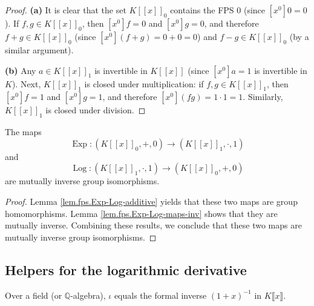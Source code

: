 \begin{proof}
\textbf{(a)} It is clear
that the set $K\left[\left[x\right]\right]_{0}$ contains the FPS $0$
(since $\left[x^{0}\right]0=0$). If $f,g\in K\left[\left[x\right]\right]_{0}$, then
$\left[x^{0}\right]f=0$ and $\left[x^{0}\right]g=0$, and therefore
$f+g\in K\left[\left[x\right]\right]_{0}$ (since
$\left[x^{0}\right]\left(
f+g\right)=0+0=0$) and $f-g\in K\left[\left[x\right]\right]
_{0}$ (by a similar argument).

\textbf{(b)} Any $a\in K\left[\left[
x\right]\right]_{1}$ is invertible
in $K\left[\left[x\right]\right]$ (since $\left[x^{0}\right]a=1$ is invertible in $K$).
Next, $K\left[\left[x\right]\right]_{1}$ is closed under
multiplication: if $f,g\in K\left[\left[x\right]\right]_{1}$,
then $\left[x^{0}\right]f=1$ and $\left[x^{0}\right]g=1$, and
therefore $\left[x^{0}\right]\left(
fg\right)=1\cdot 1=1$.
Similarly, $K\left[\left[x\right]\right]_{1}$ is closed
under division.
\end{proof}

\begin{theorem}
\label{thm.fps.Exp-Log-group-iso}
\leantarget
\leanok
The maps
\[
\operatorname{Exp}:\left(K\left[\left[x\right]\right]_{0}
,+,0\right)\rightarrow\left(K\left[\left[x\right]\right]_{1}
,\cdot,1\right)
\]
and
\[
\operatorname{Log}:\left(K\left[\left[x\right]\right]_{1}
,\cdot,1\right)\rightarrow\left(K\left[\left[x\right]\right]
_{0},+,0\right)
\]
are mutually inverse group isomorphisms.
\end{theorem}

\begin{proof}
Lemma
\ref{lem.fps.Exp-Log-additive} yields that these two maps are group
homomorphisms. Lemma \ref{lem.fps.Exp-Log-maps-inv}
shows that they are mutually inverse. Combining these results, we conclude
that these two maps are mutually inverse group isomorphisms.
\end{proof}

\subsection{Helpers for the logarithmic derivative}

\begin{lemma}[$\iota = (1+x)^{-1}$]
\label{lem.fps.invOnePlusX-eq-inv}
\leanhelper
\leanok
Over a field (or $\mathbb{Q}$-algebra), $\iota$
equals the formal inverse $(1 + x)^{-1}$ in $K\llbracket x \rrbracket$.
\end{lemma}


